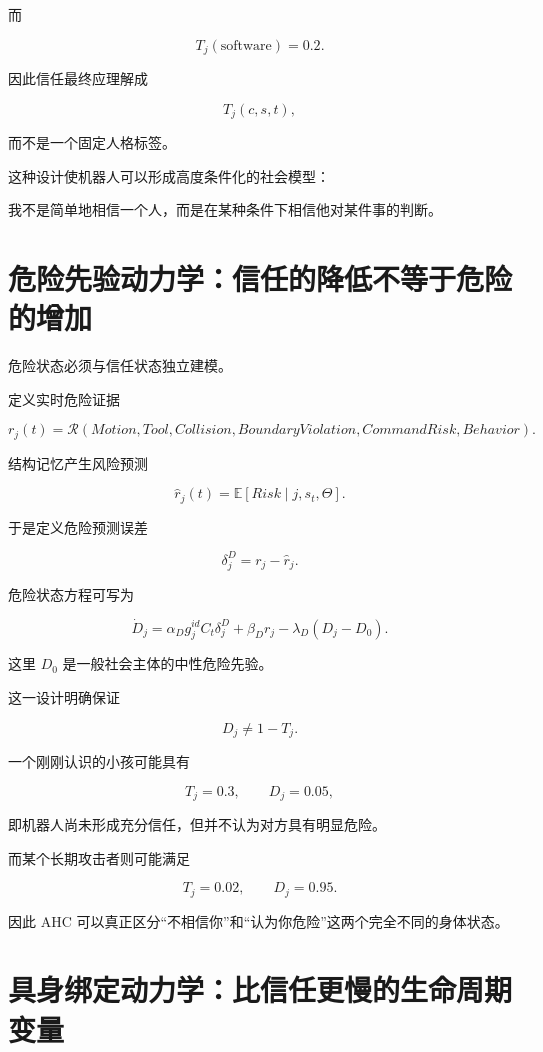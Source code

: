 而

\[
T_j(\mathrm{software})=0.2.
\]

因此信任最终应理解成

\[
T_j(c,s,t),
\]

而不是一个固定人格标签。

这种设计使机器人可以形成高度条件化的社会模型：

\begin{statementbox}
我不是简单地相信一个人，而是在某种条件下相信他对某件事的判断。
\end{statementbox}


\section{危险先验动力学：信任的降低不等于危险的增加}

危险状态必须与信任状态独立建模。

定义实时危险证据

\[
r_j(t)
=
\mathcal R
\left(
Motion,
Tool,
Collision,
BoundaryViolation,
CommandRisk,
Behavior
\right).
\]

结构记忆产生风险预测

\[
\hat r_j(t)
=
\mathbb E
\left[
Risk
\mid
j,s_t,\Theta
\right].
\]

于是定义危险预测误差

\[
\delta_j^D
=
r_j-\hat r_j.
\]

危险状态方程可写为

\[
\boxed{
\dot D_j
=
\alpha_D
g_j^{id}
C_t
\delta_j^D
+
\beta_Dr_j
-
\lambda_D(D_j-D_0).
}
\]

这里 $D_0$ 是一般社会主体的中性危险先验。

这一设计明确保证

\[
D_j\neq1-T_j.
\]

一个刚刚认识的小孩可能具有

\[
T_j=0.3,
\qquad
D_j=0.05,
\]

即机器人尚未形成充分信任，但并不认为对方具有明显危险。

而某个长期攻击者则可能满足

\[
T_j=0.02,
\qquad
D_j=0.95.
\]

因此 AHC 可以真正区分“不相信你”和“认为你危险”这两个完全不同的身体状态。


\section{具身绑定动力学：比信任更慢的生命周期变量}


